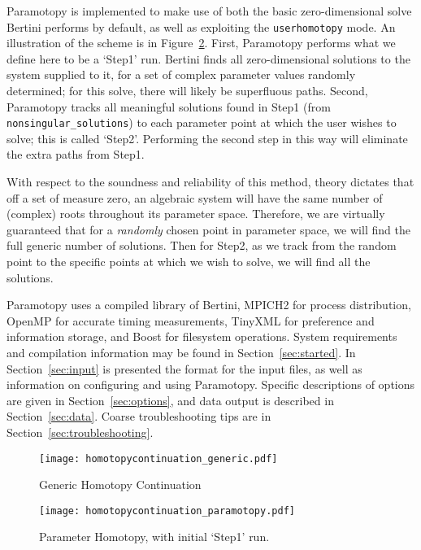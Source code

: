 Paramotopy is implemented to make use of both the basic zero-dimensional solve Bertini performs by default, as well as exploiting the \texttt{userhomotopy} mode.  An illustration of the scheme is in Figure~\ref{fig:paramotopy_homotopy_continuation}.  First, Paramotopy performs what we define here to be a `Step1' run.  Bertini finds all zero-dimensional solutions to the system supplied to it, for a set of complex parameter values randomly determined; for this solve, there will likely be superfluous paths.  Second, Paramotopy tracks all meaningful solutions found in Step1 (from \texttt{nonsingular\_solutions}) to each parameter point at which the user wishes to solve; this is called `Step2'. Performing the second step in this way will eliminate the extra paths from Step1.  
  
With respect to the soundness and reliability of this method, theory dictates that off a set of measure zero, an algebraic system will have the same number of (complex) roots throughout its parameter space.  Therefore, we are virtually guaranteed that for a \emph{randomly} chosen point in parameter space, we will find the full generic number of solutions.  Then for Step2, as we track from the random point to the specific points at which we wish to solve, we will find all the solutions.

Paramotopy uses a compiled library of Bertini, MPICH2 for process distribution, OpenMP for accurate timing measurements, TinyXML for preference and information storage, and Boost for filesystem operations.  System requirements and compilation information may be found in Section~\ref{sec:started}.  In Section~\ref{sec:input} is presented the format for the input files, as well as information on configuring and using Paramotopy.  Specific descriptions of options are given in Section~\ref{sec:options}, and data output is described in Section~\ref{sec:data}.  Coarse troubleshooting tips are in Section~\ref{sec:troubleshooting}.
  



\begin{figure}[h]
\begin{center}
\texttt{[image: homotopycontinuation\_generic.pdf]}
\caption[Generic Homotopy Continuation]{Generic Homotopy Continuation}
\label{fig:generic_homotopy_continuation}
\end{center}
\end{figure}


\begin{figure}[t]
\begin{center}
\texttt{[image: homotopycontinuation\_paramotopy.pdf]}
\caption[Parameter Homotopy]{Parameter Homotopy, with initial `Step1' run.}
\label{fig:paramotopy_homotopy_continuation}
\end{center}
\end{figure}


